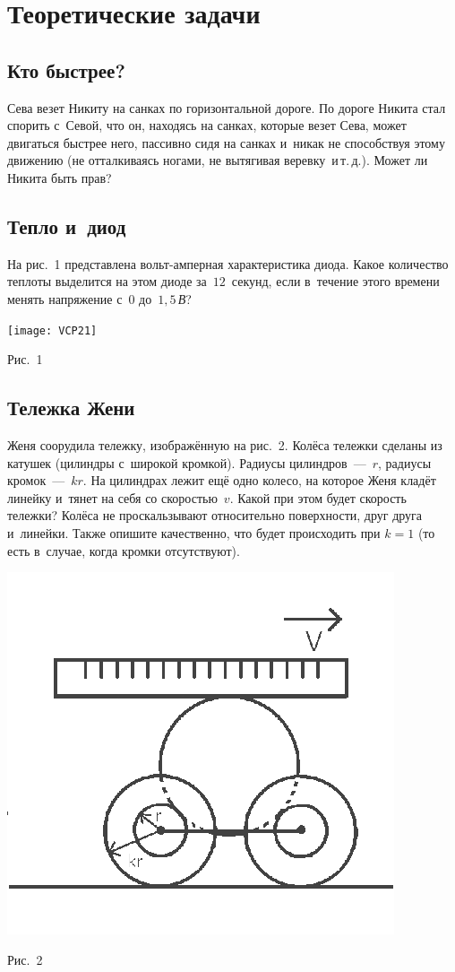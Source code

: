 \documentclass[a4paper,12pt]{article}
\newcommand\un[1]{\,\emph{#1}}
\begin{document}
\section{Теоретические задачи}

\subsection{Кто быстрее?}
Сева везет Никиту на санках по горизонтальной дороге. По дороге Никита стал спорить с~Севой,
что он, находясь на санках, которые везет Сева, может двигаться быстрее него, пассивно сидя
на санках и~никак не способствуя этому движению (не отталкиваясь ногами, не вытягивая
веревку~и\,т.\,д.). Может ли Никита быть прав?

\subsection{Тепло и~диод} На рис.~1 представлена вольт-амперная характеристика диода.
Какое количество теплоты выделится на этом диоде за~$12$~секунд, если в~течение этого
времени менять напряжение с~$0$ до~$ 1,5$\un{В}?

\medskip
\centerline{\texttt{[image: VCP21]}}
\medskip
\centerline{\small Рис.~1}

\subsection{Тележка Жени}
Женя соорудила тележку, изображённую на рис.~2. Колёса тележки сделаны из катушек
(цилиндры с~широкой кромкой). Радиусы цилиндров~---~$r$, радиусы кромок~---~$kr$.
На цилиндрах лежит ещё одно колесо, на которое Женя кладёт линейку и~тянет на себя
со скоростью~$v$. Какой при этом будет скорость тележки? Колёса не проскальзывают
относительно поверхности, друг друга и~линейки. Также опишите качественно,
что будет происходить при $k = 1$ (то есть в~случае, когда кромки отсутствуют).

\medskip
\centerline{\includegraphics[width=0.3\linewidth]{T}}
\medskip
\centerline{\small Рис.~2}

\newpage
\end{document}
